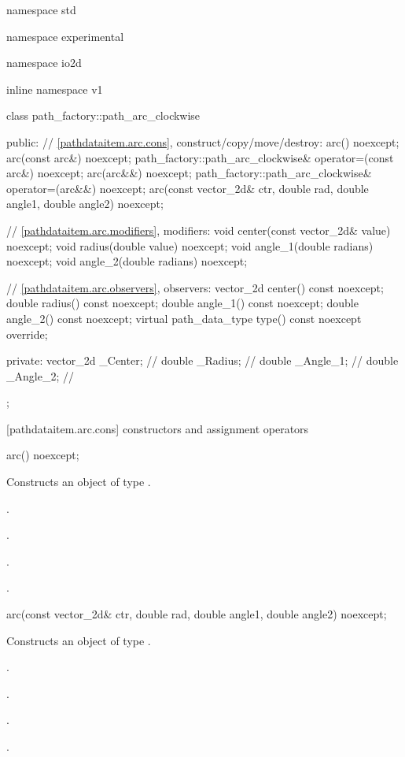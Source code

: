 \begin{codeblock}
namespace std { namespace experimental { namespace io2d { inline namespace v1 {
  class path_factory::path_arc_clockwise {
  public:
    // \ref{pathdataitem.arc.cons}, construct/copy/move/destroy:
    arc() noexcept;
    arc(const arc&) noexcept;
    path_factory::path_arc_clockwise& operator=(const arc&) noexcept;
    arc(arc&&) noexcept;
    path_factory::path_arc_clockwise& operator=(arc&&) noexcept;
    arc(const vector_2d& ctr, double rad, double angle1, double angle2) noexcept;

    // \ref{pathdataitem.arc.modifiers}, modifiers:
    void center(const vector_2d& value) noexcept;
    void radius(double value) noexcept;
    void angle_1(double radians) noexcept;
    void angle_2(double radians) noexcept;

    // \ref{pathdataitem.arc.observers}, observers:
    vector_2d center() const noexcept;
    double radius() const noexcept;
    double angle_1() const noexcept;
    double angle_2() const noexcept;
    virtual path_data_type type() const noexcept override;

  private:
    vector_2d _Center; // \expos
    double _Radius;    // \expos
    double _Angle_1;   // \expos
    double _Angle_2;   // \expos
  };
} } } }
\end{codeblock}

 [pathdataitem.arc.cons] { constructors and assignment operators}

\begin{itemdecl}
    arc() noexcept;
\end{itemdecl}
\begin{itemdescr}
	\pnum
	\effects
	Constructs an object of type .
	
	\pnum
	\postconditions
	.

	.

	.

	.
\end{itemdescr}

\begin{itemdecl}
    arc(const vector_2d& ctr, double rad, double angle1, double angle2) noexcept;
\end{itemdecl}
\begin{itemdescr}
	\pnum
	\effects
	Constructs an object of type .
	
	\pnum
	\postconditions
	.

	.

	.

	.
\end{itemdescr}

